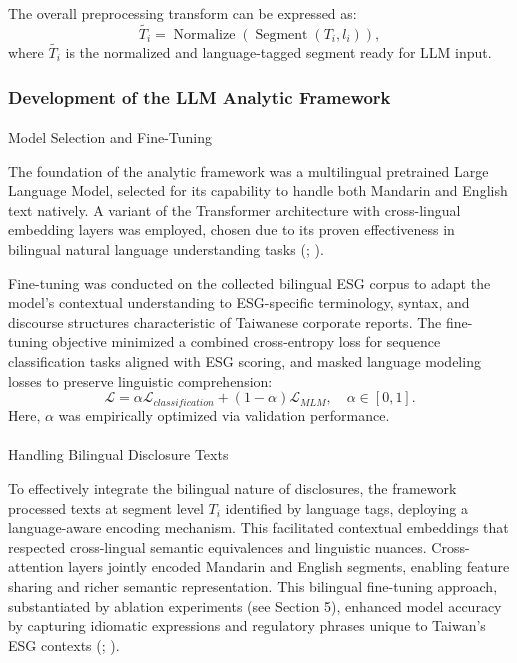 \documentclass[
  12pt,
]{article}
\makeatletter
\let\oldparagraph\paragraph
\renewcommand{\paragraph}{
    \@ifstar
      \xxxParagraphStar
      \xxxParagraphNoStar
  }
\newcommand{\xxxParagraphStar}[1]{\oldparagraph*{#1}\mbox{}}
\newcommand{\xxxParagraphNoStar}[1]{\oldparagraph{#1}\mbox{}}
\makeatother
\begin{document}
The overall preprocessing transform can be expressed as: \[
\tilde{T_i} = \operatorname{Normalize}(\operatorname{Segment}(T_i, l_i)),
\] where \(\tilde{T_i}\) is the normalized and language-tagged segment
ready for LLM input.

\subsubsection{Development of the LLM Analytic
Framework}\label{development-of-the-llm-analytic-framework}

\paragraph{Model Selection and
Fine-Tuning}\label{model-selection-and-fine-tuning}

The foundation of the analytic framework was a multilingual pretrained
Large Language Model, selected for its capability to handle both
Mandarin and English text natively. A variant of the Transformer
architecture with cross-lingual embedding layers was employed, chosen
due to its proven effectiveness in bilingual natural language
understanding tasks (;
).

Fine-tuning was conducted on the collected bilingual ESG corpus to adapt
the model's contextual understanding to ESG-specific terminology,
syntax, and discourse structures characteristic of Taiwanese corporate
reports. The fine-tuning objective minimized a combined cross-entropy
loss for sequence classification tasks aligned with ESG scoring, and
masked language modeling losses to preserve linguistic comprehension: \[
\mathcal{L} = \alpha \mathcal{L}_{classification} + (1-\alpha) \mathcal{L}_{MLM}, \quad \alpha \in [0, 1].
\] Here, \(\alpha\) was empirically optimized via validation
performance.

\paragraph{Handling Bilingual Disclosure
Texts}\label{handling-bilingual-disclosure-texts}

To effectively integrate the bilingual nature of disclosures, the
framework processed texts at segment level \(T_i\) identified by
language tags, deploying a language-aware encoding mechanism. This
facilitated contextual embeddings that respected cross-lingual semantic
equivalences and linguistic nuances. Cross-attention layers jointly
encoded Mandarin and English segments, enabling feature sharing and
richer semantic representation. This bilingual fine-tuning approach,
substantiated by ablation experiments (see Section 5), enhanced model
accuracy by capturing idiomatic expressions and regulatory phrases
unique to Taiwan's ESG contexts (; ).
\end{document}
